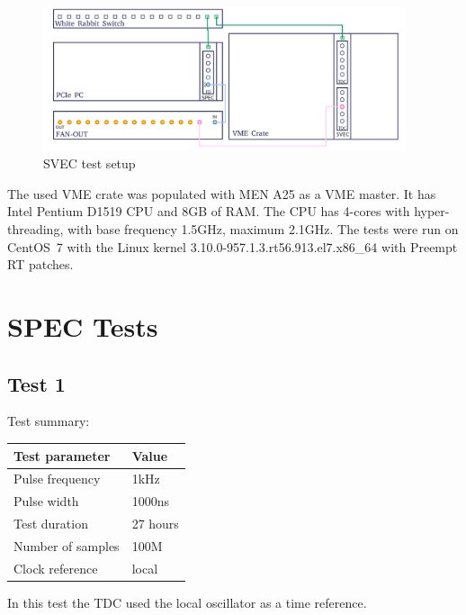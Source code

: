 \documentclass[a4paper, 12pt]{article}
\begin{document}
\begin{figure}[ht!]
  \centering
  \includegraphics[width=0.95\textwidth]{img/TDC-setup_SVEC_flat.png}
  \caption{SVEC test setup}
  \label{SVEC_test_setup_fig}
\end{figure}

The used VME crate was populated with MEN A25\cite{a25} as a VME master.
It has Intel Pentium D1519\cite{svec.cpu} CPU and 8GB of RAM.
The CPU has 4-cores with hyper-threading, with base frequency 1.5GHz,
maximum 2.1GHz.
The tests were run on CentOS~7 with the Linux kernel
3.10.0-957.1.3.rt56.913.el7.x86\_64 with Preempt RT patches.

\FloatBarrier

\section{SPEC Tests}
\label{spec_tests}

\subsection{Test 1}
\label{test1}
Test summary:
\begin{center}
  \begin{tabular}{|l|l|}
    \hline {\bf Test parameter} & {\bf Value} \\
    \hline
    Pulse frequency                      & 1kHz  \\
    Pulse width                          & 1000ns \\
    Test duration                        & 27 hours \\
    Number of samples                    & 100M \\
    Clock reference                      & local \\
    \hline
  \end{tabular}
\end{center}

In this test the TDC used the local oscillator as a time reference.
\end{document}

